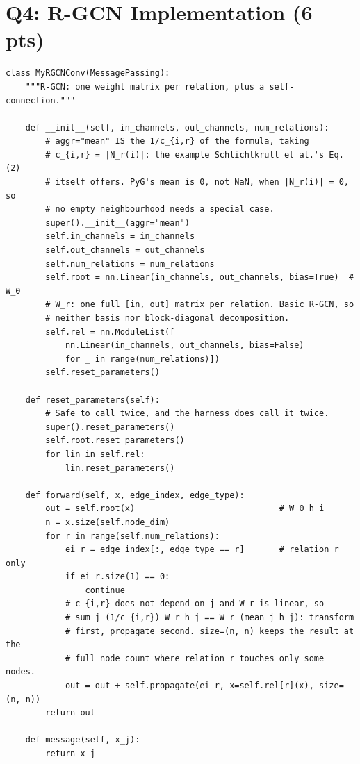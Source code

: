 \section*{Q4: R-GCN Implementation (6 pts)}



\begin{lstlisting}[style=pTwoPyStyle]
class MyRGCNConv(MessagePassing):
    """R-GCN: one weight matrix per relation, plus a self-connection."""

    def __init__(self, in_channels, out_channels, num_relations):
        # aggr="mean" IS the 1/c_{i,r} of the formula, taking
        # c_{i,r} = |N_r(i)|: the example Schlichtkrull et al.'s Eq. (2)
        # itself offers. PyG's mean is 0, not NaN, when |N_r(i)| = 0, so
        # no empty neighbourhood needs a special case.
        super().__init__(aggr="mean")
        self.in_channels = in_channels
        self.out_channels = out_channels
        self.num_relations = num_relations
        self.root = nn.Linear(in_channels, out_channels, bias=True)  # W_0
        # W_r: one full [in, out] matrix per relation. Basic R-GCN, so
        # neither basis nor block-diagonal decomposition.
        self.rel = nn.ModuleList([
            nn.Linear(in_channels, out_channels, bias=False)
            for _ in range(num_relations)])
        self.reset_parameters()

    def reset_parameters(self):
        # Safe to call twice, and the harness does call it twice.
        super().reset_parameters()
        self.root.reset_parameters()
        for lin in self.rel:
            lin.reset_parameters()

    def forward(self, x, edge_index, edge_type):
        out = self.root(x)                             # W_0 h_i
        n = x.size(self.node_dim)
        for r in range(self.num_relations):
            ei_r = edge_index[:, edge_type == r]       # relation r only
            if ei_r.size(1) == 0:
                continue
            # c_{i,r} does not depend on j and W_r is linear, so
            # sum_j (1/c_{i,r}) W_r h_j == W_r (mean_j h_j): transform
            # first, propagate second. size=(n, n) keeps the result at the
            # full node count where relation r touches only some nodes.
            out = out + self.propagate(ei_r, x=self.rel[r](x), size=(n, n))
        return out

    def message(self, x_j):
        return x_j
\end{lstlisting}

